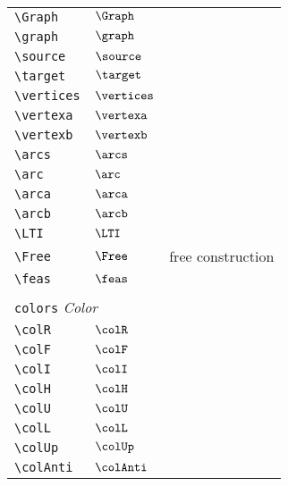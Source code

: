 \begin{longtable}{lll}
 {\color[rgb]{0.5,0.5,0.5}\texttt{\textbackslash Graph}} & $\Graph$ & \\ 
 {\color[rgb]{0.5,0.5,0.5}\texttt{\textbackslash graph}} & $\graph$ & \\ 
 {\color[rgb]{0.5,0.5,0.5}\texttt{\textbackslash source}} & $\source$ & \\ 
 {\color[rgb]{0.5,0.5,0.5}\texttt{\textbackslash target}} & $\target$ & \\ 
 {\color[rgb]{0.5,0.5,0.5}\texttt{\textbackslash vertices}} & $\vertices$ & \\ 
 {\color[rgb]{0.5,0.5,0.5}\texttt{\textbackslash vertexa}} & $\vertexa$ & \\ 
 {\color[rgb]{0.5,0.5,0.5}\texttt{\textbackslash vertexb}} & $\vertexb$ & \\ 
 {\color[rgb]{0.5,0.5,0.5}\texttt{\textbackslash arcs}} & $\arcs$ & \\ 
 {\color[rgb]{0.5,0.5,0.5}\texttt{\textbackslash arc}} & $\arc$ & \\ 
 {\color[rgb]{0.5,0.5,0.5}\texttt{\textbackslash arca}} & $\arca$ & \\ 
 {\color[rgb]{0.5,0.5,0.5}\texttt{\textbackslash arcb}} & $\arcb$ & \\ 
 {\color[rgb]{0.5,0.5,0.5}\texttt{\textbackslash LTI}} & $\LTI$ & \\ 
 {\color[rgb]{0.5,0.5,0.5}\texttt{\textbackslash Free}} & $\Free$ &  free construction\\ 
 {\color[rgb]{0.5,0.5,0.5}\texttt{\textbackslash feas}} & $\feas$ & \\ 
  &  & \\ 
 \multicolumn{3}{l}{{\color[rgb]{0.5,0.5,0.5}\texttt{colors}} \emph{Color}}\\ 
 \hline
\hline
{\color[rgb]{0.5,0.5,0.5}\texttt{\textbackslash colR}} & $\colR$ & \\ 
 {\color[rgb]{0.5,0.5,0.5}\texttt{\textbackslash colF}} & $\colF$ & \\ 
 {\color[rgb]{0.5,0.5,0.5}\texttt{\textbackslash colI}} & $\colI$ & \\ 
 {\color[rgb]{0.5,0.5,0.5}\texttt{\textbackslash colH}} & $\colH$ & \\ 
 {\color[rgb]{0.5,0.5,0.5}\texttt{\textbackslash colU}} & $\colU$ & \\ 
 {\color[rgb]{0.5,0.5,0.5}\texttt{\textbackslash colL}} & $\colL$ & \\ 
 {\color[rgb]{0.5,0.5,0.5}\texttt{\textbackslash colUp}} & $\colUp$ & \\ 
 {\color[rgb]{0.5,0.5,0.5}\texttt{\textbackslash colAnti}} & $\colAnti$ & \\ 

\end{longtable}
